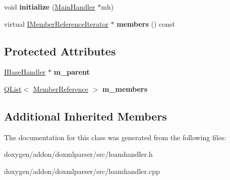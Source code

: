 \begin{DoxyCompactItemize}
\item 
\mbox{\label{class_list_of_all_members_handler_a79614404dc412d70214a7becafea6e04}} 
void {\bfseries initialize} (\mbox{\hyperlink{class_main_handler}{Main\+Handler}} $\ast$mh)
\item 
\mbox{\label{class_list_of_all_members_handler_a76488729b533a9a2b645c87d82483b3b}} 
virtual \mbox{\hyperlink{class_i_member_reference_iterator}{I\+Member\+Reference\+Iterator}} $\ast$ {\bfseries members} () const
\end{DoxyCompactItemize}
\subsection*{Protected Attributes}
\begin{DoxyCompactItemize}
\item 
\mbox{\label{class_list_of_all_members_handler_a89e0a78b3ddc9d822c23cd3126a377de}} 
\mbox{\hyperlink{class_i_base_handler}{I\+Base\+Handler}} $\ast$ {\bfseries m\+\_\+parent}
\item 
\mbox{\label{class_list_of_all_members_handler_a14a4aad7648733c9ecca9d1365dcfbc8}} 
\mbox{\hyperlink{class_q_list}{Q\+List}}$<$ \mbox{\hyperlink{class_member_reference}{Member\+Reference}} $>$ {\bfseries m\+\_\+members}
\end{DoxyCompactItemize}
\subsection*{Additional Inherited Members}


The documentation for this class was generated from the following files\+:\begin{DoxyCompactItemize}
\item 
doxygen/addon/doxmlparser/src/loamhandler.\+h\item 
doxygen/addon/doxmlparser/src/loamhandler.\+cpp\end{DoxyCompactItemize}
